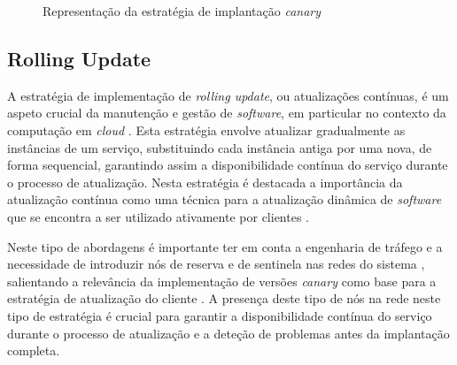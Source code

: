 \begin{figure}[H]
    \centering
    \qquad
    \caption{Representação da estratégia de implantação \textit{canary}}%
    \label{fig:canary}%
\end{figure}

\subsection{Rolling Update}

A estratégia de implementação de \textit{rolling update}, ou atualizações contínuas, é um aspeto 
crucial da manutenção e gestão de \textit{software}, em particular no contexto da computação em 
\textit{cloud} \cite{rolling2014}. Esta estratégia envolve atualizar gradualmente as instâncias de 
um serviço, substituindo cada instância antiga por uma nova, de forma sequencial, garantindo assim 
a disponibilidade contínua do serviço durante o processo de atualização. Nesta estratégia é destacada 
a importância da atualização contínua como uma técnica para a atualização dinâmica de \textit{software} 
que se encontra a ser utilizado ativamente por clientes \cite{rolling2014}. 

Neste tipo de abordagens é importante ter em conta a engenharia de tráfego e a necessidade de 
introduzir nós de reserva e de sentinela nas redes do sistema \cite{canary2022}, salientando a 
relevância da implementação de versões \textit{canary} como base para a estratégia de atualização 
do cliente \cite{canary2022}. A presença deste tipo de nós na rede neste tipo de estratégia é 
crucial para garantir a disponibilidade contínua do serviço durante o processo de atualização e a 
deteção de problemas antes da implantação completa.

